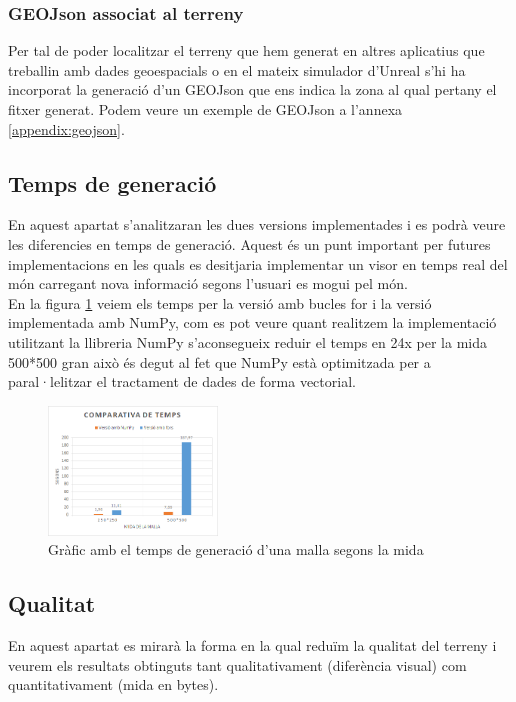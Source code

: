 \documentclass[10pt,a4paper,twocolumn,twoside]{article}
\begin{document}
\subsubsection{GEOJson associat al terreny}
Per tal de poder localitzar el terreny que hem generat en altres aplicatius que treballin amb dades geoespacials o en el mateix simulador d'Unreal s'hi ha incorporat la generació d'un GEOJson que ens indica la zona al qual pertany el fitxer generat. Podem veure un exemple de GEOJson a l'annexa \ref{appendix:geojson}.

\newpage
\subsection{Temps de generació}
En aquest apartat s'analitzaran les dues versions implementades i es podrà veure les diferencies en temps de generació. Aquest és un punt important per futures implementacions en les quals es desitjaria implementar un visor en temps real del món carregant nova informació segons l'usuari es mogui pel món. 
\\
En la figura \ref{fig-meshtime} veiem els temps per la versió amb bucles for i la versió implementada amb NumPy, com es pot veure quant realitzem la implementació utilitzant la llibreria NumPy s'aconsegueix reduir el temps en 24x per la mida 500*500 gran això és degut al fet que NumPy està optimitzada per a paral·lelitzar el tractament de dades de forma vectorial.

\begin{figure}[!h]
\centering
  	\includegraphics[width=0.4\textwidth]{meshtime}
	\caption{Gràfic amb el temps de generació d'una malla segons la mida}
	\label{fig-meshtime}
\end{figure}

\subsection{Qualitat}
\label{qualitat}
En aquest apartat es mirarà la forma en la qual reduïm la qualitat del terreny i veurem els resultats obtinguts tant qualitativament (diferència visual) com quantitativament (mida en bytes).
\end{document}
